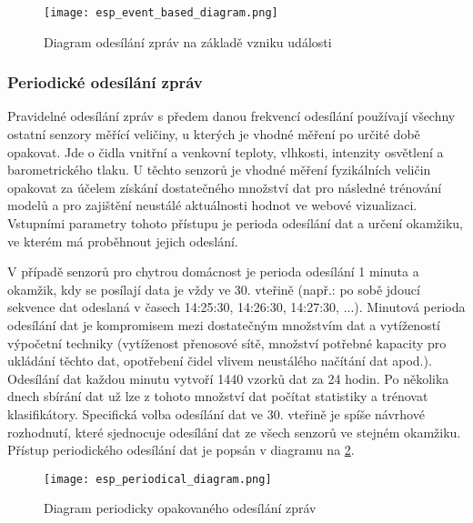 \begin{figure}[H]
  \centering
  \texttt{[image: esp\_event\_based\_diagram.png]}
  \caption{Diagram odesílání zpráv na základě vzniku události}
  \label{fig:esp_event_based_diagram}
\end{figure} 
 
 \subsubsection*{Periodické odesílání zpráv} \label{subsec:periodical_based_msg}
Pravidelné odesílání zpráv s předem danou frekvencí odesílání používají všechny ostatní senzory měřící veličiny, u kterých je vhodné měření po určité době opakovat. Jde o čidla vnitřní a venkovní teploty, vlhkosti, intenzity osvětlení a barometrického tlaku. U těchto senzorů je vhodné měření fyzikálních veličin opakovat za účelem získání dostatečného množství dat pro následné trénování modelů a pro zajištění neustálé aktuálnosti hodnot ve webové vizualizaci. Vstupními parametry tohoto přístupu je perioda odesílání dat a určení okamžiku, ve kterém má proběhnout jejich odeslání. \par
V případě senzorů pro chytrou domácnost je perioda odesílání 1 minuta a okamžik, kdy se posílají data je vždy ve 30. vteřině (např.: po sobě jdoucí sekvence dat odeslaná v časech 14:25:30, 14:26:30, 14:27:30, ...). Minutová perioda odesílání dat je kompromisem mezi dostatečným množstvím dat a vytížeností výpočetní techniky (vytíženost přenosové sítě, množství potřebné kapacity pro ukládání těchto dat, opotřebení čidel vlivem neustálého načítání dat apod.). Odesílání dat každou minutu vytvoří 1440 vzorků dat za 24 hodin. Po několika dnech sbírání dat už lze z tohoto množství dat počítat statistiky a trénovat klasifikátory. Specifická volba odesílání dat ve 30. vteřině je spíše návrhové rozhodnutí, které sjednocuje odesílání dat ze všech senzorů ve stejném okamžiku. Přístup periodického odesílání dat je popsán v diagramu na \cref{fig:esp_periodical_diagram}.

\begin{figure}[H]
  \centering
  \texttt{[image: esp\_periodical\_diagram.png]}
  \caption{Diagram periodicky opakovaného odesílání zpráv}
  \label{fig:esp_periodical_diagram}
\end{figure}

